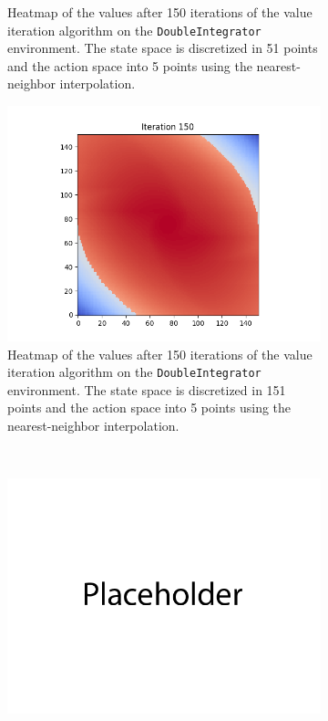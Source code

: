 \documentclass{article}
\begin{document}
\begin{enumerate}[(a)]
\begin{figure}[h!]
\begin{subfigure}{0.3\textwidth}
        \caption{Heatmap of the values after 150 iterations of the value iteration algorithm on the \texttt{DoubleIntegrator} environment. 
                The state space is discretized in 51 points and the action space into 5 points using the nearest-neighbor interpolation.}
    \end{subfigure}
        \hspace{0.1 in}
    \begin{subfigure}{0.3\textwidth}
        \centering
        \includegraphics[width=\textwidth]{figures/part_2_a_c.png}
        \caption{Heatmap of the values after 150 iterations of the value iteration algorithm on the \texttt{DoubleIntegrator} environment. 
                The state space is discretized in 151 points and the action space into 5 points using the nearest-neighbor interpolation.}
    \end{subfigure}
    \\
    \centering
    \begin{subfigure}{0.3\textwidth}
        \centering
        \includegraphics[width=\textwidth]{figures/placeholder.png}

\end{subfigure}
\end{figure}
\end{enumerate}
\end{document}
